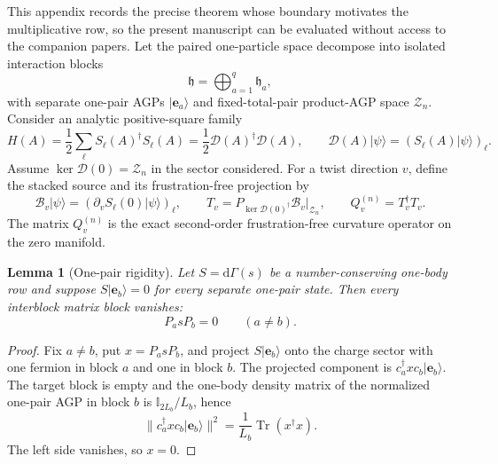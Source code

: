\documentclass[11pt]{article}
\newtheorem{lemma}[theorem]{Lemma}
\theoremstyle{definition}
\theoremstyle{remark}
\newcommand{\Tr}{\operatorname{Tr}}
\newcommand{\cZ}{\mathcal Z}
\newcommand{\ket}[1]{\lvert #1\rangle}
\newcommand{\norm}[1]{\lVert #1\rVert}
\begin{document}
This appendix records the precise theorem whose boundary motivates the multiplicative row, so the present manuscript can be evaluated without access to the companion papers.  Let the paired one-particle space decompose into isolated interaction blocks
\begin{equation}
 \mathfrak h=\bigoplus_{a=1}^q\mathfrak h_a,
\end{equation}
with separate one-pair AGPs $\ket{\mathbf e_a}$ and fixed-total-pair product-AGP space $\cZ_n$.  Consider an analytic positive-square family
\begin{equation}
 H(A)=\frac12\sum_\ell S_\ell(A)^\dagger S_\ell(A)
      =\frac12\mathcal D(A)^\dagger\mathcal D(A),
 \qquad
 \mathcal D(A)\ket\psi=(S_\ell(A)\ket\psi)_\ell.
 \label{eq:nogo-positive}
\end{equation}
Assume $\ker\mathcal D(0)=\cZ_n$ in the sector considered.  For a twist direction $v$, define the stacked source and its frustration-free projection by
\begin{equation}
 \mathcal B_v\ket\psi=(\partial_vS_\ell(0)\ket\psi)_\ell,
 \qquad
 T_v=P_{\ker\mathcal D(0)^\dagger}\mathcal B_v\big|_{\cZ_n},
 \qquad
 Q_v^{(n)}=T_v^\dagger T_v.
 \label{eq:nogo-curvature}
\end{equation}
The matrix $Q_v^{(n)}$ is the exact second-order frustration-free curvature operator on the zero manifold.

\begin{lemma}[One-pair rigidity]
\label{lem:nogo-rigidity}
Let $S=\mathrm d\Gamma(s)$ be a number-conserving one-body row and suppose $S\ket{\mathbf e_b}=0$ for every separate one-pair state.  Then every interblock matrix block vanishes:
\begin{equation}
 P_asP_b=0\qquad(a\ne b).
\end{equation}
\end{lemma}

\begin{proof}
Fix $a\ne b$, put $x=P_asP_b$, and project $S\ket{\mathbf e_b}$ onto the charge sector with one fermion in block $a$ and one in block $b$.  The projected component is $c_a^\dagger x c_b\ket{\mathbf e_b}$.  The target block is empty and the one-body density matrix of the normalized one-pair AGP in block $b$ is $\mathbb I_{2L_b}/L_b$, hence
\begin{equation}
 \norm{c_a^\dagger x c_b\ket{\mathbf e_b}}^2
 =\frac1{L_b}\Tr(x^\dagger x).
\end{equation}
The left side vanishes, so $x=0$.
\end{proof}
\end{document}
